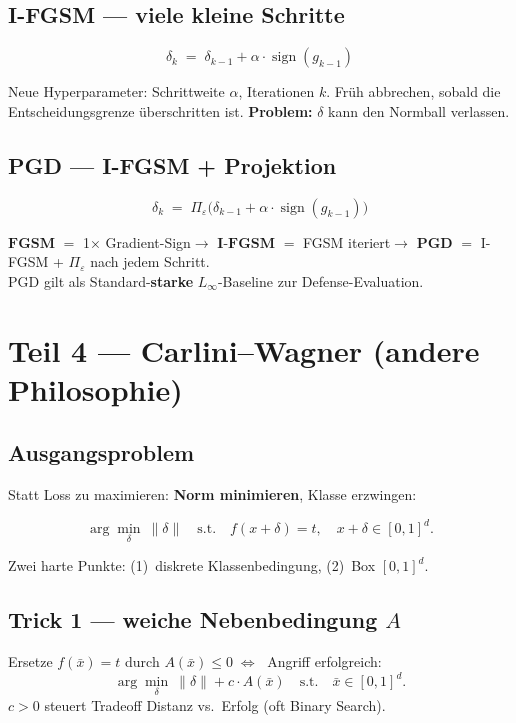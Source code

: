 \documentclass[11pt,a4paper]{article}
\newcommand{\eps}{\varepsilon}
\begin{document}
\subsection{I-FGSM --- viele kleine Schritte}
\begin{formulabox}
\[
\delta_k \;=\; \delta_{k-1} + \alpha\cdot\operatorname{sign}(g_{k-1})
\]
\end{formulabox}
Neue Hyperparameter: Schrittweite $\alpha$, Iterationen $k$.
Früh abbrechen, sobald die Entscheidungsgrenze überschritten ist.
\textbf{Problem:} $\delta$ kann den Normball verlassen.

\subsection{PGD --- I-FGSM + Projektion}
\begin{formulabox}
\[
\boxed{\delta_k \;=\; \Pi_\eps\big(\delta_{k-1} + \alpha\cdot\operatorname{sign}(g_{k-1})\big)}
\]
\end{formulabox}

\begin{linkbox}
$\textbf{FGSM}$ $=$ 1× Gradient-Sign\quad$\to$\quad
$\textbf{I-FGSM}$ $=$ FGSM iteriert\quad$\to$\quad
$\textbf{PGD}$ $=$ I-FGSM + $\Pi_\eps$ nach jedem Schritt.\\
PGD gilt als Standard-\textbf{starke} $L_\infty$-Baseline zur Defense-Evaluation.
\end{linkbox}

\section{Teil 4 --- Carlini--Wagner (andere Philosophie)}

\subsection{Ausgangsproblem}
Statt Loss zu maximieren: \textbf{Norm minimieren}, Klasse erzwingen:
\begin{formulabox}
\[
\arg\min_\delta\ \|\delta\|
\quad\text{s.t.}\quad
f(x+\delta)=t,\quad x+\delta\in[0,1]^d.
\]
\end{formulabox}
Zwei harte Punkte: (1)~diskrete Klassenbedingung, (2)~Box $[0,1]^d$.

\subsection{Trick 1 --- weiche Nebenbedingung $A$}
Ersetze $f(\bar x)=t$ durch $A(\bar x)\le 0 \;\Leftrightarrow\;$ Angriff erfolgreich:
\[
\arg\min_\delta\ \|\delta\| + c\cdot A(\bar x)
\quad\text{s.t.}\quad
\bar x\in[0,1]^d.
\]
$c>0$ steuert Tradeoff Distanz vs.\ Erfolg (oft Binary Search).
\end{document}
